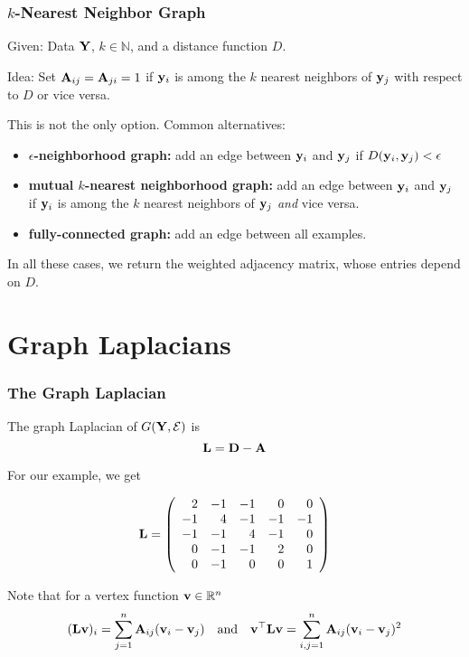 \documentclass[12pt,handout]{beamer}
\begin{document}
\begin{frame}
	\frametitle{$k$-Nearest Neighbor Graph}
	Given: Data ${\bf Y}$, $k \in \mathbb{N}$, and a distance function $D$.
	
	Idea: Set  ${\bf A}_{ij} = {\bf A}_{ji}=1$ if 
		${\bf y}_i$ is among the $k$ nearest neighbors of ${\bf y}_j$ with respect to $D$ or vice versa.
		

    \bigskip
	
	This is not the only option. Common alternatives:
	\begin{itemize}
		\item \textbf{$\epsilon$-neighborhood graph: } add an edge between ${\bf y}_i$ and ${\bf y}_j$ if $D({\bf y}_i,{\bf y}_j) < \epsilon$
		\item \textbf{mutual $k$-nearest neighborhood graph: } add an edge between ${\bf y}_i$ and ${\bf y}_j$ if 
		${\bf y}_i$ is among the $k$ nearest neighbors of ${\bf y}_j$ \emph{and} vice versa.
		 \item \textbf{fully-connected graph: } add an edge between all examples. 
	\end{itemize}
	
	\bigskip
	
	In all these cases, we return the weighted adjacency matrix, whose entries depend on $D$.
	

\end{frame}

\section{Graph Laplacians} %
\label{sec:graph_laplacians}

\begin{frame}
\frametitle{The Graph Laplacian }

The graph Laplacian of $G({\bf Y},{\cal E})$ is
$$ {\bf L} = {\bf D}  - {\bf A} $$ 

 For our example, we get

$$ {\bf L} = \left(\begin{array}{rrrrr} 2  & -1 & -1 & 0  & 0  \\
           				 -1 & 4  & -1 & -1 & -1 \\
           				 -1 & -1 & 4  & -1 & 0 \\
           				 0  & -1 & -1 & 2  & 0  \\
           				 0  & -1 & 0 & 0  & 1  \end{array} \right)$$

Note that for a vertex function ${\bf v} \in \mathbb{R}^n$
$$ ({\bf L} {\bf v})_i =  \sum_{j=1}^n {\bf A}_{ij} ({\bf v}_i - {\bf v}_j) \quad \text{and} \quad {\bf v}^{\top}{\bf L} {\bf v} =  \sum_{i,j=1}^n  {\bf A}_{ij}({\bf v}_i - {\bf v}_j)^2$$


\end{frame}
\end{document}
